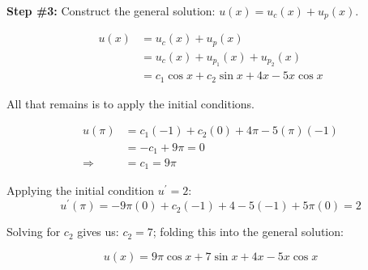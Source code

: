 \vspace{0.20cm}

\noindent\textbf{Step \#3:} Construct the general solution: $u(x)=u_c(x)+u_p(x)$.

\begin{align*}
u(x) &= u_c(x) + u_p(x) \\ 
&= u_c(x) + u_{p_1}(x)+u_{p_2}(x) \\
&= c_1\cos{x}+c_2\sin{x}+4x-5x\cos{x}
\end{align*}

\noindent All that remains is to apply the initial conditions.  

\begin{align*}
u(\pi) &= c_1(-1)+c_2(0)+4\pi -5(\pi)(-1) \\
&=-c_1+9\pi = 0 \\
\Rightarrow &= c_1 = 9\pi
\end{align*}

\vspace{0.1cm}

\noindent Applying the initial condition $u^{\prime}=2$:
\begin{equation*}
u^{\prime}(\pi)=-9\pi(0)+c_2(-1)+4-5(-1)+5\pi(0)=2
\end{equation*}

\vspace{0.1cm}

\noindent Solving for $c_2$ gives us: $c_2 = 7$; folding this into the general solution:

\begin{equation*}
u(x) = 9\pi \cos{x}+7\sin{x}+4x-5x\cos{x}
\end{equation*}
